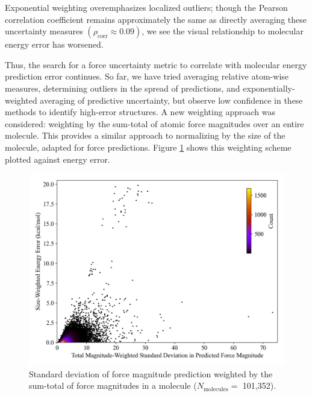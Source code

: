 Exponential weighting overemphasizes localized outliers; though the Pearson correlation coefficient remains approximately the same as directly averaging these uncertainty measures $(\rho_{\text{corr}} \approx 0.09)$, we see the visual relationship to molecular energy error has worsened. 

Thus, the search for a force uncertainty metric to correlate with molecular energy prediction error continues.
So far, we have tried averaging relative atom-wise measures, determining outliers in the spread of predictions, and exponentially-weighted averaging of predictive uncertainty, but observe low confidence in these methods to identify high-error structures. 
A new weighting approach was considered: weighting by the sum-total of atomic force magnitudes over an entire molecule.
This provides a similar approach to normalizing by the size of the molecule, adapted for force predictions.
Figure \ref{fig:forces_weighted_by_total_magnitudes} shows this weighting scheme plotted against energy error.

\begin{figure}[!hb]
    \centering
    \includegraphics[width=1\linewidth]{Images/2xr_forces/weighted_force_stdev-vs-energy_error.png}
    \caption[Standard deviation of force magnitude prediction weighted by the sum-total of force magnitudes in a molecule (COMP6v1)]{Standard deviation of force magnitude prediction weighted by the sum-total of force magnitudes in a molecule ($N_\text{molecules}=$ 101,352).}
    \label{fig:forces_weighted_by_total_magnitudes}
\end{figure}

